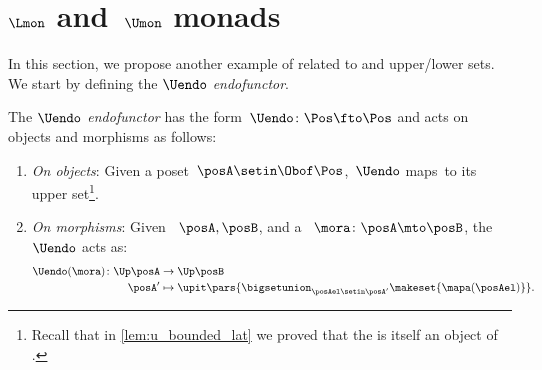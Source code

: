 %
%

\section{$\Lmon$ and~$\Umon$ monads}
In this section, we propose another example of  related to  and upper/lower sets.
We start by defining the \emph{$\Uendo$ endofunctor}.
\begin{definition}
    \label{def:Uendo}
    The \emph{$\Uendo$ endofunctor} has the form~$\Uendo \colon \Pos \fto \Pos$ and acts on objects and morphisms as follows:
    \begin{enumerate}
        \item \emph{On objects}: Given a poset~$\posA \setin \Obof\Pos$,~$\Uendo$ maps~\posA to its upper set\footnote{Recall that in \cref{lem:u_bounded_lat} we proved that the  is itself an object of \Pos.
              }.
        \item \emph{On morphisms}: Given ~$\posA,\posB$, and a ~$\mora \colon \posA\mto \posB$, the~$\Uendo$  acts as:
              \begin{equation}
                  \begin{aligned}
                      \Uendo(\mora)\colon \Up \posA & \to \Up \posB \\
                      \posA'                        & \mapsto \upit \pars{ \bigsetunion_{\posAel\setin \posA'} \makeset{\mapa(\posAel)}}.
                  \end{aligned}
              \end{equation}
    \end{enumerate}
\end{definition}

